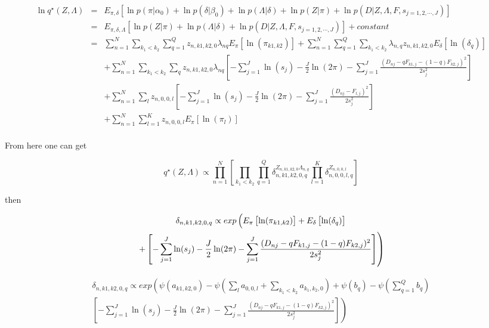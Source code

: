 \documentclass[11pt,authoryear]{article}
\begin{document}
\begin{eqnarray}
\ln q^{\star} (Z, \Lambda)  & = & E_{\pi, \delta} \left [ \ln p(\pi|\alpha_0) + \ln p(\delta | \beta_0) + \ln p(\Lambda | \delta) + \ln p(Z | \pi) + \ln p(D | Z, \Lambda, F, s_{j=1,2,\cdots,J}) \right ] \\ \nonumber
  & = & E_{\pi, \delta, \Lambda} \left [ \ln p(Z | \pi) + \ln p(\Lambda | \delta) + \ln p(D | Z, \Lambda, F, s_{j=1,2,\cdots,J}) \right] + constant \\\nonumber
  & = & \sum_{n=1}^{N} \sum_{k_1 < k_2}\sum_{q=1}^{Q} z_{n, k1, k2, 0} \lambda_{nq} E_{\pi} \left [ \ln (\pi_{k1, k2}) \right ] + \sum_{n=1}^{N} \sum_{q=1}^{Q} \sum_{k_1 < k_2} \lambda_{n,q} z_{n, k1, k2, 0} E_{\delta} \left [ \ln (\delta_{q}) \right] \\ \nonumber
  &&  + \sum_{n=1}^{N} \sum_{k_1 < k_2}  \sum_{q} z_{n, k1, k2, 0} \lambda_{nq} \left [ - \sum_{j=1}^{J} \ln (s_j) - \frac{J}{2} \ln (2 \pi) - \sum_{j=1}^{J} \frac{(D_{nj} - qF_{k1,j} - (1-q)F_{k2,j})^2}{2s^2_j} \right] \\ \nonumber
  &&  +  \sum_{n=1}^{N} \sum_{l}  z_{n, 0, 0, l} \left [ - \sum_{j=1}^{J} \ln (s_j) - \frac{J}{2} \ln (2 \pi) - \sum_{j=1}^{J} \frac{(D_{nj} - F_{l,j} )^2}{2s^2_j} \right] \\ \nonumber 
  && +  \sum_{n=1}^{N} \sum_{l=1}^{K} z_{n, 0, 0, l} E_{\pi} \left [ \ln (\pi_{l}) \right ] \\ \nonumber
\end{eqnarray}

From here one can get 

$$ q^{\star}(Z, \Lambda) \propto \prod_{n=1}^{N} \left[\prod_{k_1 < k_2} \prod_{q=1}^{Q} \delta_{n, k1, k2, 0, q}^{Z_{n, k1, k2, 0} \Lambda_{n,q}} \prod_{l=1}^{K} \delta_{n, 0, 0, l, q}^{Z_{n, 0, 0, l}} \right]$$

then 

\begin{multline}
 $$ \delta_{n, k1, k2, 0, q} \propto exp \left (  E_{\pi} \left [ \ln (\pi_{k1,k2}) \right] +  E_{\delta} \left [ \ln (\delta_{q}) \right ] \right. \\
 \left . +  \left [ - \sum_{j=1}^{J} \ln (s_j)  - \frac{J}{2} \ln (2 \pi) - \sum_{j=1}^{J} \frac{(D_{nj} - qF_{k1,j} - (1-q)F_{k2,j})^2}{2s^2_j} \right] \right ) 
\end{multline}

\begin{multline}
  \delta_{n, k1, k2, 0, q} \propto exp \left ( \psi({a_{k1, k2, 0}}) - \psi(\sum_{l} a_{0, 0, l} + \sum_{k_1 < k_2} a_{k_1, k_2, 0})  +   \psi(b_{q}) - \psi(\sum_{q=1}^{Q} b_{q}) \right . \\
  \left . \left [ - \sum_{j=1}^{J} \ln (s_j)  - \frac{J}{2} \ln (2 \pi) -  \sum_{j=1}^{J} \frac{(D_{nj} - qF_{k1,j} - (1-q)F_{k2,j})^2}{2s^2_j} \right] \right ) 
\end{multline}
\end{document}
